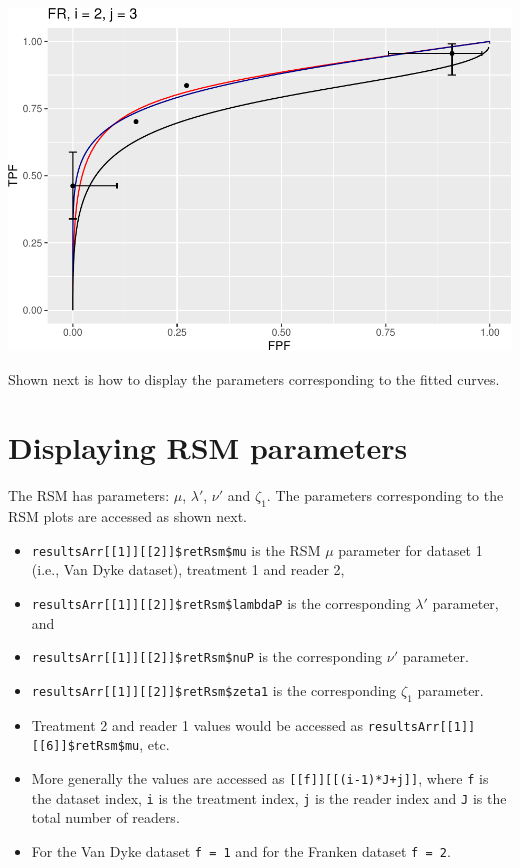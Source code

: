 \documentclass[
]{book}
\providecommand{\tightlist}{%
  \setlength{\itemsep}{0pt}\setlength{\parskip}{0pt}}
\begin{document}
\includegraphics{19b-rsm-3-fits_files/figure-latex/unnamed-chunk-3-1.pdf}

Shown next is how to display the parameters corresponding to the fitted curves.

\hypertarget{rsm-3-fits-rsm-parameters}{%
\section{Displaying RSM parameters}\label{rsm-3-fits-rsm-parameters}}

The RSM has parameters: \(\mu\), \(\lambda'\), \(\nu'\) and \(\zeta_1\). The parameters corresponding to the RSM plots are accessed as shown next.

\begin{itemize}
\tightlist
\item
  \texttt{resultsArr{[}{[}1{]}{]}{[}{[}2{]}{]}\$retRsm\$mu} is the RSM \(\mu\) parameter for dataset 1 (i.e., Van Dyke dataset), treatment 1 and reader 2,
\item
  \texttt{resultsArr{[}{[}1{]}{]}{[}{[}2{]}{]}\$retRsm\$lambdaP} is the corresponding \(\lambda'\) parameter, and\\
\item
  \texttt{resultsArr{[}{[}1{]}{]}{[}{[}2{]}{]}\$retRsm\$nuP} is the corresponding \(\nu'\) parameter.
\item
  \texttt{resultsArr{[}{[}1{]}{]}{[}{[}2{]}{]}\$retRsm\$zeta1} is the corresponding \(\zeta_1\) parameter.
\item
  Treatment 2 and reader 1 values would be accessed as
  \texttt{resultsArr{[}{[}1{]}{]}{[}{[}6{]}{]}\$retRsm\$mu}, etc.
\item
  More generally the values are accessed as \texttt{{[}{[}f{]}{]}{[}{[}(i-1)*J+j{]}{]}}, where \texttt{f} is the dataset index, \texttt{i} is the treatment index, \texttt{j} is the reader index and \texttt{J} is the total number of readers.
\item
  For the Van Dyke dataset \texttt{f\ =\ 1} and for the Franken dataset \texttt{f\ =\ 2}.
\end{itemize}
\end{document}

